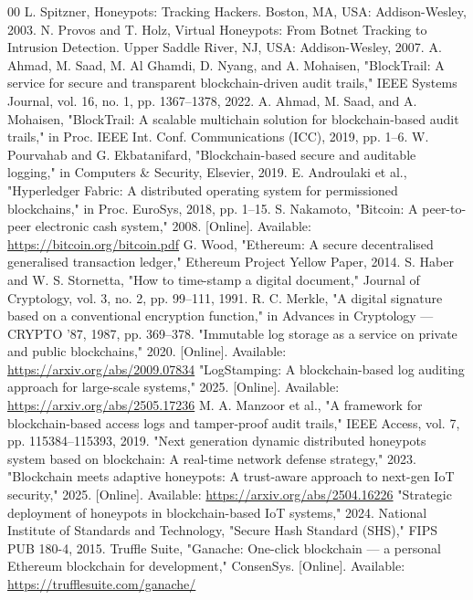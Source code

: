 \documentclass[conference]{IEEEtran}
\begin{document}
\begin{thebibliography}{00}
 L. Spitzner, Honeypots: Tracking Hackers. Boston, MA, USA: Addison-Wesley, 2003.
 N. Provos and T. Holz, Virtual Honeypots: From Botnet Tracking to Intrusion Detection. Upper Saddle River, NJ, USA: Addison-Wesley, 2007.
 A. Ahmad, M. Saad, M. Al Ghamdi, D. Nyang, and A. Mohaisen, "BlockTrail: A service for secure and transparent blockchain-driven audit trails," IEEE Systems Journal, vol. 16, no. 1, pp. 1367--1378, 2022.
 A. Ahmad, M. Saad, and A. Mohaisen, "BlockTrail: A scalable multichain solution for blockchain-based audit trails," in Proc. IEEE Int. Conf. Communications (ICC), 2019, pp. 1--6.
 W. Pourvahab and G. Ekbatanifard, "Blockchain-based secure and auditable logging," in Computers \& Security, Elsevier, 2019.
 E. Androulaki et al., "Hyperledger Fabric: A distributed operating system for permissioned blockchains," in Proc. EuroSys, 2018, pp. 1--15.
 S. Nakamoto, "Bitcoin: A peer-to-peer electronic cash system," 2008. [Online]. Available: \url{https://bitcoin.org/bitcoin.pdf}
 G. Wood, "Ethereum: A secure decentralised generalised transaction ledger," Ethereum Project Yellow Paper, 2014.
 S. Haber and W. S. Stornetta, "How to time-stamp a digital document," Journal of Cryptology, vol. 3, no. 2, pp. 99--111, 1991.
 R. C. Merkle, "A digital signature based on a conventional encryption function," in Advances in Cryptology --- CRYPTO '87, 1987, pp. 369--378.
 "Immutable log storage as a service on private and public blockchains," 2020. [Online]. Available: \url{https://arxiv.org/abs/2009.07834}
 "LogStamping: A blockchain-based log auditing approach for large-scale systems," 2025. [Online]. Available: \url{https://arxiv.org/abs/2505.17236}
 M. A. Manzoor et al., "A framework for blockchain-based access logs and tamper-proof audit trails," IEEE Access, vol. 7, pp. 115384--115393, 2019.
 "Next generation dynamic distributed honeypots system based on blockchain: A real-time network defense strategy," 2023.
 "Blockchain meets adaptive honeypots: A trust-aware approach to next-gen IoT security," 2025. [Online]. Available: \url{https://arxiv.org/abs/2504.16226}
 "Strategic deployment of honeypots in blockchain-based IoT systems," 2024.
 National Institute of Standards and Technology, "Secure Hash Standard (SHS)," FIPS PUB 180-4, 2015.
 Truffle Suite, "Ganache: One-click blockchain --- a personal Ethereum blockchain for development," ConsenSys. [Online]. Available: \url{https://trufflesuite.com/ganache/}

\end{thebibliography}
\end{document}
